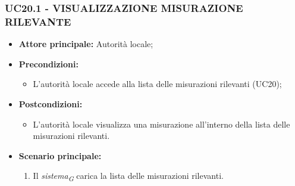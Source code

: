 \subsubsection{UC20.1 - VISUALIZZAZIONE MISURAZIONE RILEVANTE}
\begin{itemize}
        \item \textbf{Attore principale:} Autorità locale;
        \item \textbf{Precondizioni:}
                \begin{itemize}
                        \item L'autorità locale accede alla lista delle misurazioni rilevanti (UC20);
                \end{itemize}
        \item \textbf{Postcondizioni:}
                \begin{itemize}
                        \item L'autorità locale visualizza una misurazione all'interno della lista delle misurazioni rilevanti.
                \end{itemize}
        \item \textbf{Scenario principale:}
                \begin{enumerate}
                        \item Il \textit{sistema}\textsubscript{\textit{G}} carica la lista delle misurazioni rilevanti.
                \end{enumerate}
\end{itemize}